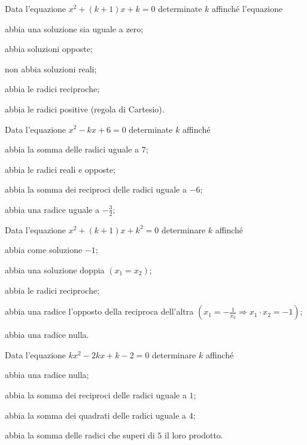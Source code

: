 \begin{esercizio}[\Ast]
 \label{ese:3.99}
Data l'equazione $x^{2} + (k + 1) x + k = 0$ determinate $k$ affinché l'equazione
\begin{enumeratea}
\item abbia una soluzione sia uguale a zero;
\item abbia soluzioni opposte;
\item non abbia soluzioni reali;
\item abbia le radici reciproche;
\item abbia le radici positive (regola di Cartesio).
\end{enumeratea}
\end{esercizio}

\begin{esercizio}[\Ast]
 \label{ese:3.100}
Data l'equazione $x^{2}-kx + 6 = 0$ determinate $k$ affinché
\begin{enumeratea}
\item abbia la somma delle radici uguale a $7$;
\item abbia le radici reali e opposte;
\item abbia la somma dei reciproci delle radici uguale a $-6$;
\item abbia una radice uguale a $- \frac{3}{2}$;
\end{enumeratea}
\end{esercizio}

\begin{esercizio}[\Ast]
 \label{ese:3.101}
Data l'equazione $x^{2} + (k + 1) x + k^{2} = 0$ determinare $k$ affinché
\begin{enumeratea}
\item abbia come soluzione $-1$;
\item abbia una soluzione doppia $(x_1 =x_2)$;
\item abbia le radici reciproche;
\item abbia una radice l'opposto della reciproca dell'altra $\left(x_1=-\frac{1}{x_2}\Rightarrow x_1 \cdot x_2=-1\right)$;
\item abbia una radice nulla.
\end{enumeratea}
\end{esercizio}

\begin{esercizio}[\Ast]
 \label{ese:3.102}
Data l'equazione $kx^{2}-2kx + k-2 = 0$ determinare $k$ affinché
\begin{enumeratea}
\item abbia una radice nulla;
\item abbia la somma dei reciproci delle radici uguale a $1$;
\item abbia la somma dei quadrati delle radici uguale a $4$;
\item abbia la somma delle radici che superi di $5$ il loro prodotto.
\end{enumeratea}
\end{esercizio}

